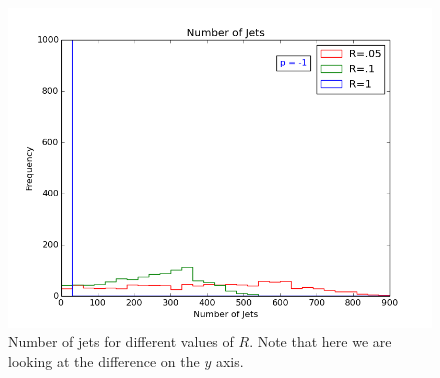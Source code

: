 \begin{figure}[hbtp]
 \centering
 \includegraphics[scale=.5]{images/n_of_jets_obs.png}
 \caption{Number of jets for different values of $R$. Note that here we are looking at the difference on the $y$ axis. 
 }\label{nofjet}
 \end{figure}
  
